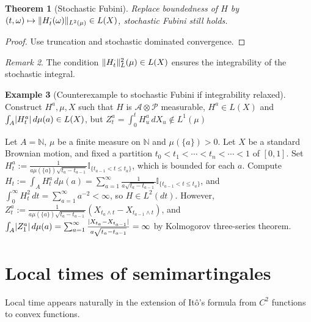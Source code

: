 \documentclass[openany,oneside]{book}
\newtheorem{thm}{Theorem}[section]
\theoremstyle{definition}
\newtheorem{eg}[thm]{Example}
\theoremstyle{remark}
\newtheorem{rem}[thm]{Remark}
\newcommand{\I}{\mathbb{I}} %
\DeclarePairedDelimiter{\abs}{\lvert}{\rvert} %
\DeclarePairedDelimiter{\norm}{\lVert}{\rVert} %
\newcommand{\pred}{\mathcal{P}} %
\begin{document}
\begin{thm}[Stochastic Fubini]
Replace boundedness of $H$ by $(t,\omega) \mapsto \norm{H^\cdot_t(\omega)}_{L^2(\mu)} \in L(X)$, stochastic Fubini still holds.
\end{thm}
\begin{proof}
Use truncation and stochastic dominated convergence.
\end{proof}
\begin{rem}
The condition $\norm{H^\cdot_t}_L^2(\mu) \in L(X)$ ensures the integrability of the stochastic integral.
\end{rem}

\begin{eg}[Counterexample to stochastic Fubini if integrability relaxed]
Construct $H^a, \mu, X$ such that $H$ is $\mathcal{A}\otimes\pred$ measurable, $H^a \in L(X)$ and $\int_A \abs{H^a_t} \,d\mu(a) \in L(X)$, but $Z^a_t = \int_0^t H^a_u \,d X_u \not\in L^1(\mu)$
\par
Let $A=\mathbb{N}$, $\mu$ be a finite measure on $\mathbb{N}$ and $\mu(\{a\})>0$. Let $X$ be a standard Brownian motion, and fixed a partition $t_0 < t_1 < \cdots < t_n < \cdots < 1$ of $[0,1]$. Set $H^a_t := \frac{1}{a\mu(\{a\}) \sqrt{t_a - t_{a-1}}} \I_{\{t_{a-1} < t\le t_a\}}$, which is bounded for each $a$. Compute $H_t := \int_A H^a_t \,d\mu(a) = \sum_{a=1}^\infty \frac{1}{a\sqrt{t_a - t_{a-1}}} \I_{\{t_{a-1} < t \le t_a\}}$, and $\int_0^\infty H^2_t \,d t = \sum_{a=1}^\infty a^{-2} < \infty$, so $H\in L^2(d t)$. However, $Z^a_t := \frac{1}{a\mu(\{a\})\sqrt{t_a - t_{a-1}}} (X_{t_a\wedge t} - X_{t_{a-1}\wedge t})$, and $\int_A \abs{Z^a_1} \,d\mu(a) = \sum_{a=1}^\infty \frac{\abs{X_{t_a}-X_{t_{a-1}}}}{a\sqrt{t_a - t_{a-1}}} = \infty$ by Kolmogorov three-series theorem.
\end{eg}




\section{Local times of semimartingales}
Local time appears naturally in the extension of It\^o's formula from $C^2$ functions to convex functions.
\end{document}
